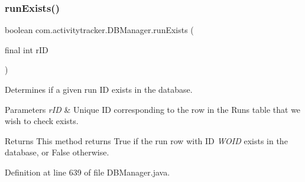 \mbox{\label{classcom_1_1activitytracker_1_1_d_b_manager_a723ac1c573bacdd0b62894357bd65a9b}} 
\subsubsection{\texorpdfstring{run\+Exists()}{runExists()}}
{\footnotesize\ttfamily boolean com.\+activitytracker.\+D\+B\+Manager.\+run\+Exists (\begin{DoxyParamCaption}\item[{final int}]{r\+ID }\end{DoxyParamCaption})}

Determines if a given run ID exists in the database.


\begin{DoxyParams}{Parameters}
{\em r\+ID} & Unique ID corresponding to the row in the Runs table that we wish to check exists.\\
\hline
\end{DoxyParams}
\begin{DoxyReturn}{Returns}
This method returns True if the run row with ID {\itshape W\+O\+ID} exists in the database, or False otherwise. 
\end{DoxyReturn}


Definition at line 639 of file D\+B\+Manager.\+java.


